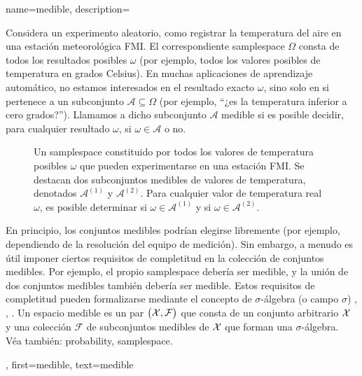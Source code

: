 {name={medible}, 
	description={
		Considera un experimento aleatorio, como registrar la temperatura del aire en una estación meteorológica FMI. 
		El correspondiente \gls{samplespace} $\Omega$ consta de todos los resultados posibles $\omega$ (por ejemplo, 
		todos los valores posibles de temperatura en grados Celsius). En muchas aplicaciones de aprendizaje automático, no estamos interesados 
		en el resultado exacto $\omega$, sino solo en si pertenece a un subconjunto $\mathcal{A} \subseteq \Omega$ 
		(por ejemplo, “¿es la temperatura inferior a cero grados?”). Llamamos a dicho subconjunto $\mathcal{A}$ medible si es 
		posible decidir, para cualquier resultado $\omega$, si $\omega \in \mathcal{A}$ o no. 
		\begin{figure}[H]
			\vspace*{10mm}
		\caption{Un \gls{samplespace} constituido por todos los valores de temperatura posibles $\omega$ 
			que pueden experimentarse en una estación FMI. Se destacan dos subconjuntos medibles de valores de temperatura, 
			denotados $\mathcal{A}^{(1)}$ y $\mathcal{A}^{(2)}$. Para cualquier 
			valor de temperatura real $\omega$, es posible determinar si $\omega \in \mathcal{A}^{(1)}$ y si $\omega \in \mathcal{A}^{(2)}$.
			} 
		\end{figure}
		En principio, los conjuntos medibles podrían elegirse libremente (por ejemplo, dependiendo de la resolución del 
		equipo de medición). Sin embargo, a menudo es útil imponer ciertos requisitos de completitud 
		en la colección de conjuntos medibles. Por ejemplo, el propio \gls{samplespace} debería ser 
		medible, y la unión de dos conjuntos medibles también debería ser medible. Estos requisitos de completitud 
		pueden formalizarse mediante el concepto de $\sigma$-álgebra (o campo $\sigma$) \cite{RudinBook}, \cite{BillingsleyProbMeasure}, \cite{durrett2010probability}. 
		Un espacio medible es un par $\big(\mathcal{X},\mathcal{F}\big)$ que consta de un conjunto arbitrario $\mathcal{X}$ y una 
		colección $\mathcal{F}$ de subconjuntos medibles de $\mathcal{X}$ que forman una $\sigma$-álgebra. 
	\\
		Véa también: \gls{probability}, \gls{samplespace}.},
	first={medible},
	text={medible} 
}



